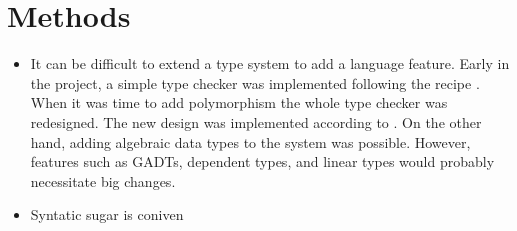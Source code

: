 \chapter{Methods}



\begin{itemize}
    \item It can be difficult to extend a type system to add a language feature.
    Early in the project, a simple type checker was implemented following the recipe \cite{bidir}.
    When it was time to add polymorphism the whole type checker was redesigned. The new design 
    was implemented according to \cite{bidir-higher}. On the other hand, adding algebraic data types to the system was possible. However, features such as GADTs, dependent types, and linear types would probably necessitate big changes.
    \item Syntatic sugar is coniven
\end{itemize}
